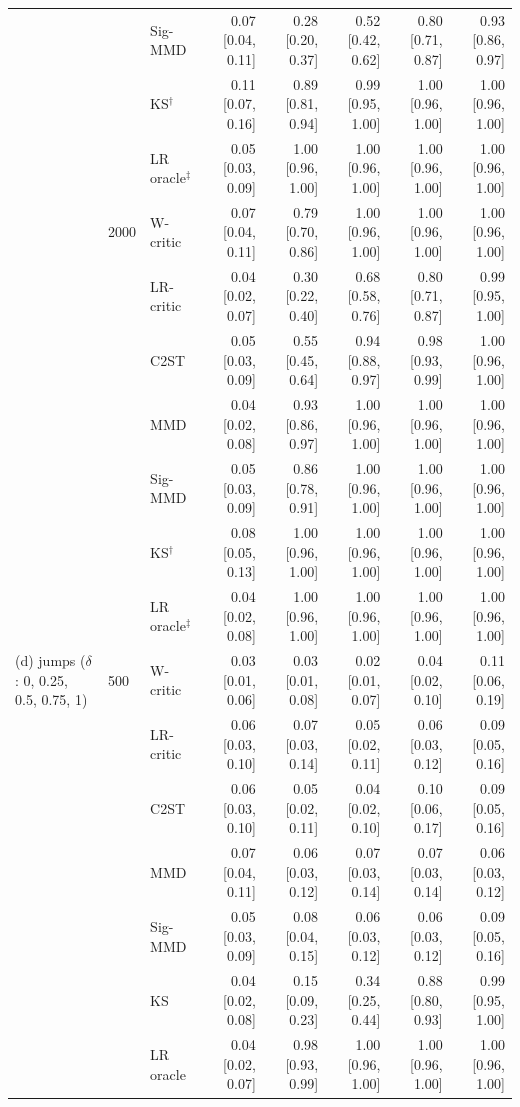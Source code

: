 \begin{tabular}{lllrrrrr}
 &  & Sig-MMD & 0.07 [0.04, 0.11] & 0.28 [0.20, 0.37] & 0.52 [0.42, 0.62] & 0.80 [0.71, 0.87] & 0.93 [0.86, 0.97] \\
 &  & KS$^{\dagger}$ & 0.11 [0.07, 0.16] & 0.89 [0.81, 0.94] & 0.99 [0.95, 1.00] & 1.00 [0.96, 1.00] & 1.00 [0.96, 1.00] \\
 &  & LR oracle$^{\ddagger}$ & 0.05 [0.03, 0.09] & 1.00 [0.96, 1.00] & 1.00 [0.96, 1.00] & 1.00 [0.96, 1.00] & 1.00 [0.96, 1.00] \\
 & 2000 & W-critic & 0.07 [0.04, 0.11] & 0.79 [0.70, 0.86] & 1.00 [0.96, 1.00] & 1.00 [0.96, 1.00] & 1.00 [0.96, 1.00] \\
 &  & LR-critic & 0.04 [0.02, 0.07] & 0.30 [0.22, 0.40] & 0.68 [0.58, 0.76] & 0.80 [0.71, 0.87] & 0.99 [0.95, 1.00] \\
 &  & C2ST & 0.05 [0.03, 0.09] & 0.55 [0.45, 0.64] & 0.94 [0.88, 0.97] & 0.98 [0.93, 0.99] & 1.00 [0.96, 1.00] \\
 &  & MMD & 0.04 [0.02, 0.08] & 0.93 [0.86, 0.97] & 1.00 [0.96, 1.00] & 1.00 [0.96, 1.00] & 1.00 [0.96, 1.00] \\
 &  & Sig-MMD & 0.05 [0.03, 0.09] & 0.86 [0.78, 0.91] & 1.00 [0.96, 1.00] & 1.00 [0.96, 1.00] & 1.00 [0.96, 1.00] \\
 &  & KS$^{\dagger}$ & 0.08 [0.05, 0.13] & 1.00 [0.96, 1.00] & 1.00 [0.96, 1.00] & 1.00 [0.96, 1.00] & 1.00 [0.96, 1.00] \\
 &  & LR oracle$^{\ddagger}$ & 0.04 [0.02, 0.08] & 1.00 [0.96, 1.00] & 1.00 [0.96, 1.00] & 1.00 [0.96, 1.00] & 1.00 [0.96, 1.00] \\
(d) jumps ($\delta$: 0, 0.25, 0.5, 0.75, 1) & 500 & W-critic & 0.03 [0.01, 0.06] & 0.03 [0.01, 0.08] & 0.02 [0.01, 0.07] & 0.04 [0.02, 0.10] & 0.11 [0.06, 0.19] \\
 &  & LR-critic & 0.06 [0.03, 0.10] & 0.07 [0.03, 0.14] & 0.05 [0.02, 0.11] & 0.06 [0.03, 0.12] & 0.09 [0.05, 0.16] \\
 &  & C2ST & 0.06 [0.03, 0.10] & 0.05 [0.02, 0.11] & 0.04 [0.02, 0.10] & 0.10 [0.06, 0.17] & 0.09 [0.05, 0.16] \\
 &  & MMD & 0.07 [0.04, 0.11] & 0.06 [0.03, 0.12] & 0.07 [0.03, 0.14] & 0.07 [0.03, 0.14] & 0.06 [0.03, 0.12] \\
 &  & Sig-MMD & 0.05 [0.03, 0.09] & 0.08 [0.04, 0.15] & 0.06 [0.03, 0.12] & 0.06 [0.03, 0.12] & 0.09 [0.05, 0.16] \\
 &  & KS & 0.04 [0.02, 0.08] & 0.15 [0.09, 0.23] & 0.34 [0.25, 0.44] & 0.88 [0.80, 0.93] & 0.99 [0.95, 1.00] \\
 &  & LR oracle & 0.04 [0.02, 0.07] & 0.98 [0.93, 0.99] & 1.00 [0.96, 1.00] & 1.00 [0.96, 1.00] & 1.00 [0.96, 1.00] \\

\end{tabular}
